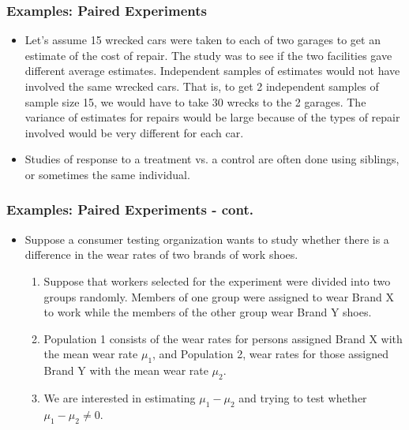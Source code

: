 \documentclass[xcolor=dvipsnames,12pt]{beamer}
\begin{document}
\begin{frame}
\frametitle{Examples: Paired Experiments}
\begin{itemize}
\item Let's assume 15  wrecked cars 
 were taken to each of two garages to get an
 estimate of the cost of repair.  The study was to see
 if the two facilities gave different average estimates.
 Independent samples of estimates would not have involved
 the same wrecked cars. That is, to get 2 independent samples of
 sample size 15, we would have to take 30 wrecks to the 2 garages.
 The variance of estimates for repairs would be large
 because of the types of repair involved would be very different
 for each car.
\item Studies of response to a treatment vs. a control are
often done using siblings, or sometimes the same
individual.
\end{itemize}
\end{frame}



\begin{frame}
\frametitle{Examples: Paired Experiments - cont.}
\begin{itemize}
\item Suppose a consumer testing organization wants to study whether there
is a difference in the wear rates of two  brands of work
shoes.
\begin{enumerate}
\item Suppose that workers selected for the experiment were divided into two groups randomly. 
Members of one group were assigned to wear Brand X to work  while the members of the other 
group wear Brand Y shoes.
\item Population 1 consists of the wear rates for persons assigned 
Brand X with the mean wear rate $\mu_1$, and Population 2, wear rates for those assigned 
Brand Y with the mean wear rate  $\mu_2$.
\item We are interested in estimating $\mu_1 - \mu_2$ and trying to test
whether $\mu_1 - \mu_2 \neq 0$.
\end{enumerate}
\end{itemize}
\end{frame}
\end{document}
